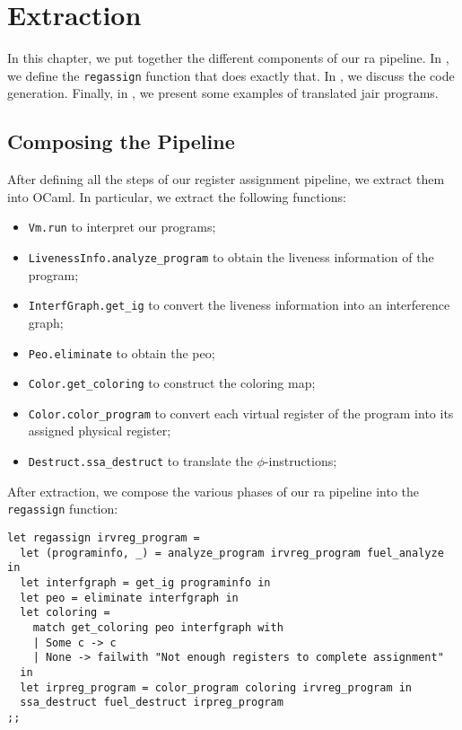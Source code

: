 
\chapter{Extraction}
\label{cha:extraction}

In this chapter, we put together the different components of our \gls{ra} pipeline. In , we define the \texttt{regassign} function that does exactly that. In , we discuss the code generation. Finally, in , we present some examples of translated \gls{jair} programs.

\section{Composing the Pipeline}
\label{sec:pipeline}

After defining all the steps of our register assignment pipeline, we extract them into OCaml.
In particular, we extract the following functions:
\begin{itemize}
  \item \texttt{Vm.run} to interpret our programs;
  \item \texttt{LivenessInfo.analyze\_program} to obtain the liveness information of the program;
  \item \texttt{InterfGraph.get\_ig} to convert the liveness information into an interference graph;
  \item \texttt{Peo.eliminate} to obtain the \gls{peo};
  \item \texttt{Color.get\_coloring} to construct the coloring map;
  \item \texttt{Color.color\_program} to convert each virtual register of the program into its assigned physical register;
  \item \texttt{Destruct.ssa\_destruct} to translate the $\phi$-instructions;
\end{itemize}

After extraction, we compose the various phases of our \gls{ra} pipeline into the \texttt{regassign} function:

\begin{lstlisting}[style=OCaml]
let regassign irvreg_program =
  let (programinfo, _) = analyze_program irvreg_program fuel_analyze in
  let interfgraph = get_ig programinfo in
  let peo = eliminate interfgraph in
  let coloring =
    match get_coloring peo interfgraph with
    | Some c -> c
    | None -> failwith "Not enough registers to complete assignment"
  in
  let irpreg_program = color_program coloring irvreg_program in
  ssa_destruct fuel_destruct irpreg_program
;;
\end{lstlisting}

